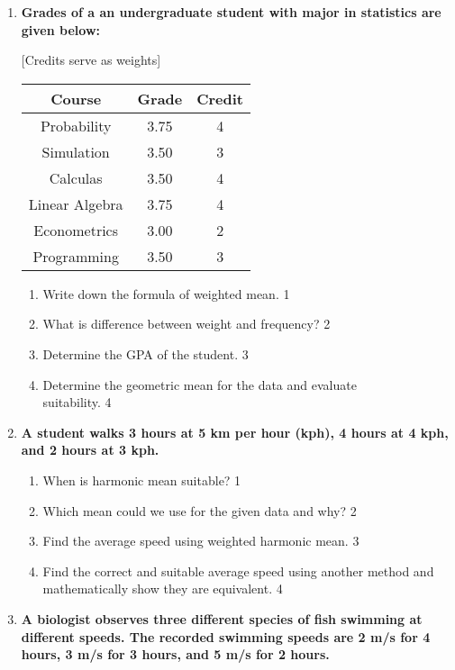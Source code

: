 \documentclass[a4paper,oneside]{book}
\begin{document}
\begin{enumerate}
   \item
	  \textbf{Grades of a an undergraduate student with major in statistics are given below: } 
	  
	  [Credits serve as weights]

\begin{table}[h]
\centering
\begin{tabular}{c|c|c}
\hline
Course & Grade & Credit \\ \hline
Probability & 3.75 & 4 \\ 
Simulation & 3.50 & 3 \\ 
Calculas & 3.50 & 4 \\ 
Linear Algebra & 3.75 & 4 \\ 
Econometrics & 3.00 & 2 \\ 
Programming & 3.50 & 3 \\ \hline
\end{tabular}
\end{table}

  
  \begin{enumerate}
    \item
	Write down the formula of weighted mean. \hfill 1
    \item
	What is difference between weight and frequency? \hfill 2
    \item  
	Determine the GPA of the student. \hfill 3
    \item
	Determine the geometric mean for the data and evaluate \\ suitability. \hfill 4
  \end{enumerate}

 \item
	  \textbf{A student walks 3 hours at 5 km per hour (kph), 4 hours at 4 kph, and 2 hours at 3 kph.} 
  
  \begin{enumerate}
    \item
	When is harmonic mean suitable? \hfill 1
    \item
	Which mean could we use for the given data and why? \hfill 2
    \item  
	Find the average speed using weighted harmonic mean. \hfill 3
    \item
	Find the correct and suitable average speed using another method and mathematically show they are equivalent. \hfill 4
  \end{enumerate}
  
  \item
\textbf{A biologist observes three different species of fish swimming at 
different speeds. The recorded swimming speeds are 2 m/s for 4 hours, 
3 m/s for 3 hours, and 5 m/s for 2 hours.}


\end{enumerate}
\end{document}
